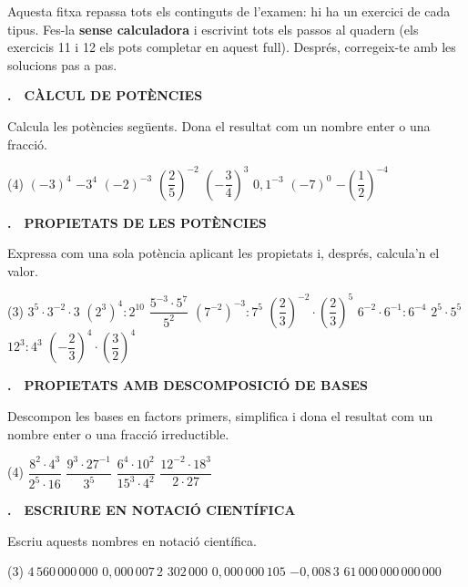 \documentclass[11pt,a4paper]{article}
\newcommand{\seccio}[2]{}
\newcounter{exer}
\newcommand{\ex}[2]{\par\needspace{5\baselineskip}\bigskip\stepcounter{exer}\noindent
  {\color{cursfosc}\bfseries\theexer.}\ \ {\scriptsize\bfseries\color{curs}\MakeUppercase{#1}}\par\nopagebreak\smallskip
  \noindent #2\par}
\begin{document}
\thispagestyle{primera}

\vspace{8pt}

\begin{tcolorbox}[colback=soft,colframe=soft,arc=2mm,left=3mm,right=3mm,top=1.5mm,bottom=1.5mm]
\small Aquesta fitxa repassa tots els continguts de l'examen: hi ha un exercici de cada tipus. Fes-la \textbf{sense calculadora} i escrivint tots els passos al quadern (els exercicis 11 i 12 els pots completar en aquest full). Després, corregeix-te amb les solucions pas a pas.
\end{tcolorbox}

\seccio{A}{Potències i notació científica}

\ex{Càlcul de potències}{Calcula les potències següents. Dona el resultat com un nombre enter o una fracció.}
\begin{tasks}(4)
  \task $(-3)^{4}$
  \task $-3^{4}$
  \task $(-2)^{-3}$
  \task $\left(\dfrac25\right)^{-2}$
  \task $\left(-\dfrac34\right)^{3}$
  \task $0,1^{-3}$
  \task $(-7)^{0}$
  \task $-\left(\dfrac12\right)^{-4}$
\end{tasks}

\ex{Propietats de les potències}{Expressa com una sola potència aplicant les propietats i, després, calcula'n el valor.}
\begin{tasks}(3)
  \task $3^{5}\cdot3^{-2}\cdot3$
  \task $\left(2^{3}\right)^{4}:2^{10}$
  \task $\dfrac{5^{-3}\cdot5^{7}}{5^{2}}$
  \task $\left(7^{-2}\right)^{-3}:7^{5}$
  \task $\left(\dfrac23\right)^{-2}\cdot\left(\dfrac23\right)^{5}$
  \task $6^{-2}\cdot6^{-1}:6^{-4}$
  \task $2^{5}\cdot5^{5}$
  \task $12^{3}:4^{3}$
  \task $\left(-\dfrac23\right)^{4}\cdot\left(\dfrac32\right)^{4}$
\end{tasks}

\ex{Propietats amb descomposició de bases}{Descompon les bases en factors primers, simplifica i dona el resultat com un nombre enter o una fracció irreductible.}
\begin{tasks}(4)
  \task $\dfrac{8^{2}\cdot4^{3}}{2^{5}\cdot16}$
  \task $\dfrac{9^{3}\cdot27^{-1}}{3^{5}}$
  \task $\dfrac{6^{4}\cdot10^{2}}{15^{3}\cdot4^{2}}$
  \task $\dfrac{12^{-2}\cdot18^{3}}{2\cdot27}$
\end{tasks}

\ex{Escriure en notació científica}{Escriu aquests nombres en notació científica.}
\begin{tasks}(3)
  \task $4\,560\,000\,000$
  \task $0,000\,007\,2$
  \task $302\,000$
  \task $0,000\,000\,105$
  \task $-0,008\,3$
  \task $61\,000\,000\,000\,000$
\end{tasks}
\end{document}
